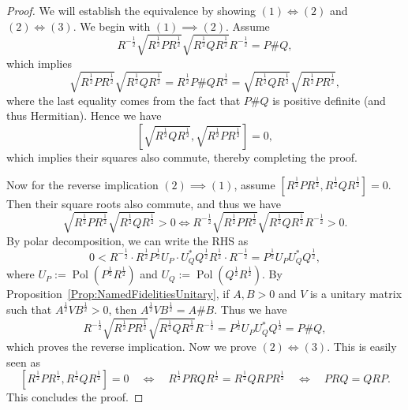 \documentclass[12pt]{article}
\theoremstyle{definition}
\begin{document}
\begin{proof}
We will establish the equivalence by showing $(1) \iff (2)$ and $(2) \iff (3)$. We begin with $(1) \implies (2)$. Assume
\begin{equation}
R^{-\frac 12} \sqrt{R^{\frac 12} P R^{\frac 12}} \sqrt{R^{\frac 12} Q R^{\frac 12}} R^{-\frac 12} = P \# Q,
\end{equation}
which implies 
\begin{equation}
\sqrt{R^{\frac 12} P R^{\frac 12}} \sqrt{R^{\frac 12} Q R^{\frac 12}} = R^{\frac 12} P \# Q R^{\frac 12} = \sqrt{R^{\frac 12} Q R^{\frac 12}} \sqrt{R^{\frac 12} P R^{\frac 12}},
\end{equation}
where the last equality comes from the fact that $P \# Q$ is positive definite (and thus Hermitian). Hence we have
\begin{equation}
\left[\sqrt{R^{\frac 12} Q R^{\frac 12}}, \sqrt{R^{\frac 12} P R^{\frac 12}}\right] = 0,
\end{equation}
which implies their squares also commute, thereby completing the proof.

Now for the reverse implication $(2) \implies (1)$, assume $\left[ R ^{\frac12}  P R ^{\frac12}  , R ^{\frac12}  Q R ^{\frac12} \right] = 0$. Then their square roots also commute, and thus we have
\begin{equation}
\sqrt{R^{\frac 12} P R^{\frac 12}} \sqrt{R^{\frac 12} Q R^{\frac 12}} > 0 \iff R^{-\frac 12} \sqrt{R^{\frac 12} P R^{\frac 12}} \sqrt{R^{\frac 12} Q R^{\frac 12}} R^{-\frac 12} > 0.
\end{equation}
By polar decomposition, we can write the RHS as
\begin{equation}
0 < R^{-\frac 12} \cdot R^{\frac 12} P^{\frac 12} U_P \cdot U_Q^* Q^{\frac 12} R^{\frac 12} \cdot R^{-\frac 12} = P^{\frac 12} U_P U_Q^* Q^{\frac 12},
\end{equation}
where $U_P := \operatorname{Pol}\left(P ^{\frac 12} R ^{\frac 12} \right)$ and $U_Q := \operatorname{Pol}\left(Q ^{\frac 12} R ^{\frac 12} \right)$. By Proposition~\ref{Prop:NamedFidelitiesUnitary}, if $A, B > 0$ and $V$ is a unitary matrix such that $A^{\frac 12} V B^{\frac 12} > 0$, then $A^{\frac 12} V B^{\frac 12} = A \# B$. Thus we have
\begin{equation}
R^{-\frac 12} \sqrt{R^{\frac 12} P R^{\frac 12}} \sqrt{R^{\frac 12} Q R^{\frac 12}} R^{-\frac 12} = P^{\frac 12} U_P U_Q^* Q^{\frac 12} = P \# Q,
\end{equation}
which proves the reverse implication. Now we prove $(2) \Longleftrightarrow (3)$. This is easily seen as
\begin{equation}
    \left[R ^{\frac 12} P R ^{\frac 12} , R ^{\frac 12} Q R ^{\frac 12} \right] = 0 \quad \Longleftrightarrow \quad   R ^{\frac 12} P R Q R ^{\frac 12}  = R ^{\frac 12} Q R P R ^{\frac 12}  \quad \Longleftrightarrow \quad P R Q = Q R P.
\end{equation}
 This concludes the proof. \end{proof}
\end{document}
